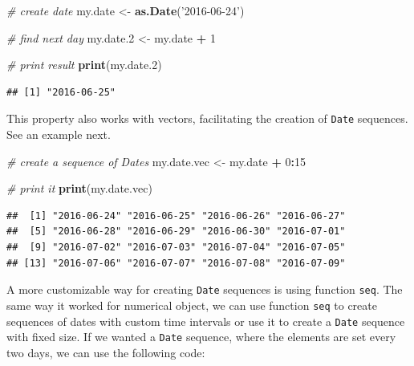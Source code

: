 \documentclass[11pt,]{book}
\newenvironment{Shaded}{\begin{snugshade}}{\end{snugshade}}
\newcommand{\KeywordTok}[1]{\textcolor[rgb]{0.27,0.27,0.27}{\textbf{#1}}}
\newcommand{\DecValTok}[1]{\textcolor[rgb]{0.06,0.06,0.06}{#1}}
\newcommand{\StringTok}[1]{\textcolor[rgb]{0.5,0.5,0.5}{#1}}
\newcommand{\CommentTok}[1]{\textcolor[rgb]{0.56,0.35,0.01}{\textit{#1}}}
\newcommand{\OperatorTok}[1]{\textcolor[rgb]{0.81,0.36,0.00}{\textbf{#1}}}
\newcommand{\NormalTok}[1]{#1}
\begin{document}
\begin{Shaded}
\begin{Highlighting}[]
\CommentTok{# create date}
\NormalTok{my.date <-}\StringTok{ }\KeywordTok{as.Date}\NormalTok{(}\StringTok{'2016-06-24'}\NormalTok{)}

\CommentTok{# find next day}
\NormalTok{my.date.}\DecValTok{2}\NormalTok{ <-}\StringTok{ }\NormalTok{my.date }\OperatorTok{+}\StringTok{ }\DecValTok{1}

\CommentTok{# print result}
\KeywordTok{print}\NormalTok{(my.date.}\DecValTok{2}\NormalTok{)}
\end{Highlighting}
\end{Shaded}

\begin{verbatim}
## [1] "2016-06-25"
\end{verbatim}

This property also works with vectors, facilitating the creation of
\texttt{Date} sequences. See an example next.

\begin{Shaded}
\begin{Highlighting}[]
\CommentTok{# create a sequence of Dates}
\NormalTok{my.date.vec <-}\StringTok{ }\NormalTok{my.date }\OperatorTok{+}\StringTok{ }\DecValTok{0}\OperatorTok{:}\DecValTok{15}

\CommentTok{# print it}
\KeywordTok{print}\NormalTok{(my.date.vec)}
\end{Highlighting}
\end{Shaded}

\begin{verbatim}
##  [1] "2016-06-24" "2016-06-25" "2016-06-26" "2016-06-27"
##  [5] "2016-06-28" "2016-06-29" "2016-06-30" "2016-07-01"
##  [9] "2016-07-02" "2016-07-03" "2016-07-04" "2016-07-05"
## [13] "2016-07-06" "2016-07-07" "2016-07-08" "2016-07-09"
\end{verbatim}

A more customizable way for creating \texttt{Date} sequences is using
function \texttt{seq}. The same way it worked for numerical object, we
can use function \texttt{seq} to create sequences of dates with custom
time intervals or use it to create a \texttt{Date} sequence with fixed
size. If we wanted a \texttt{Date} sequence, where the elements are set
every two days, we can use the following code: 
\end{document}
